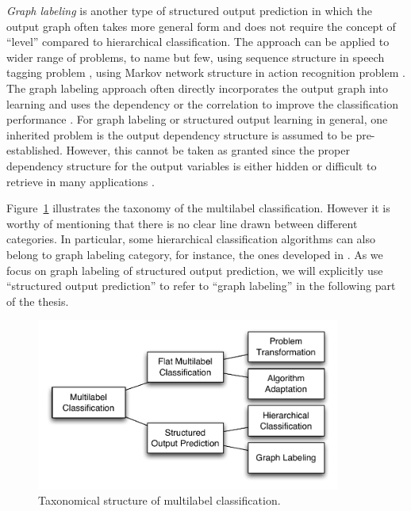 \textit{Graph labeling} is another type of structured output prediction in which the output graph often takes more general form and does not require the concept of ``level'' compared to hierarchical classification.
The approach can be applied to wider range of problems, to name but few, using sequence structure in speech tagging problem \citep{collins02a}, using Markov network structure in action recognition problem \citep{Wang11hidden}. 
The graph labeling approach often directly incorporates the output graph into learning and uses the dependency or the correlation to improve the classification performance \citep{collins02a,lafferty01,taskar02,Taskar04max,THJA04,Rousu07}.
For graph labeling or structured output learning in general, one inherited problem is the output dependency structure is assumed to be pre-established.
However, this cannot be taken as granted since the proper dependency structure for the output variables is either hidden or difficult to retrieve in many applications \citep{Chickering94learning}.

Figure~\ref{multilabel_taxonomy} illustrates the taxonomy of the multilabel classification.
However it is worthy of mentioning that there is no clear line drawn between different categories.
In particular, some hierarchical classification algorithms can also belong to graph labeling category, for instance, the ones developed in \citep{THJA04,Rousu06}.
As we focus on graph labeling of structured output prediction, we will explicitly use ``structured output prediction'' to refer to ``graph labeling'' in the following part of the thesis.

\begin{figure}
\begin{center}
	\centering
	\includegraphics[width=10cm]{./taxonomy.pdf}
	\caption{Taxonomical structure of multilabel classification.}
	\label{multilabel_taxonomy}
\end{center}
\end{figure}

